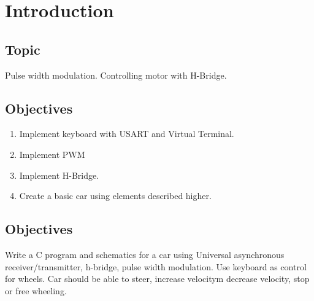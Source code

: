 \section*{\center Introduction}


\subsection*{Topic}
Pulse width modulation. Controlling motor with H-Bridge.


\subsection*{Objectives}
\begin{enumerate}
	\item Implement keyboard with USART and Virtual Terminal.
    \item Implement PWM
    \item Implement H-Bridge.
    \item Create a basic car using elements described higher.
\end{enumerate}


\subsection*{Objectives}
Write  a C program and schematics for a car using Universal asynchronous receiver/transmitter, h-bridge, pulse width modulation. Use keyboard as control for wheels. Car should be able to steer, increase velocitym decrease velocity, stop or free wheeling.

